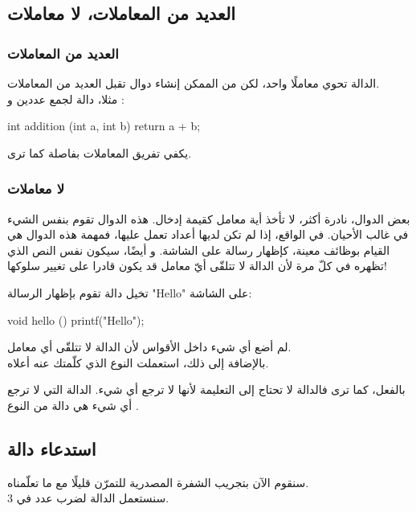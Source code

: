 \subsection{العديد من المعاملات، لا معاملات}

\subsubsection{العديد من المعاملات}

الدالة
تحوي معاملًا واحد، لكن من الممكن إنشاء دوال تقبل العديد من المعاملات.\\
مثلا، دالة 
لجمع عددين
و 
:

\begin{Csource}
int addition (int a, int b)
{
	return a + b;
}
\end{Csource}

يكفي تفريق المعاملات بفاصلة كما ترى.

\subsubsection{لا معاملات}

بعض الدوال، نادرة أكثر، لا تأخذ أية معامل كقيمة إدخال. هذه الدوال تقوم بنفس الشيء في غالب الأحيان. في الواقع، إذا لم تكن لديها أعداد تعمل عليها، فمهمة هذه الدوال هي القيام بوظائف معينة، كإظهار رسالة على الشاشة. و أيضًا، سيكون نفس النص الذي تظهره في كلّ مرة لأن الدالة لا تتلقّى أيّ معامل قد يكون قادرا على تغيير سلوكها!

تخيل دالة
تقوم بإظهار الرسالة
"\textenglish{Hello}"
على الشاشة:

\begin{Csource}
void hello ()
{
	printf("Hello");
}
\end{Csource}

لم أضع أي شيء داخل الأقواس لأن الدالة لا تتلقّى أي معامل.\\
بالإضافة إلى ذلك، استعملت النوع 
الذي كلّمتك عنه أعلاه.

بالفعل، كما ترى فالدالة لا تحتاج إلى التعليمة 
لأنها لا ترجع أي شيء. الدالة التي لا ترجع أي شيء هي دالة من النوع
.

\subsection{استدعاء دالة}

سنقوم الآن بتجريب الشفرة المصدرية للتمرّن قليلًا مع ما تعلّمناه.\\
سنستعمل الدالة 
لضرب عدد في 3.

